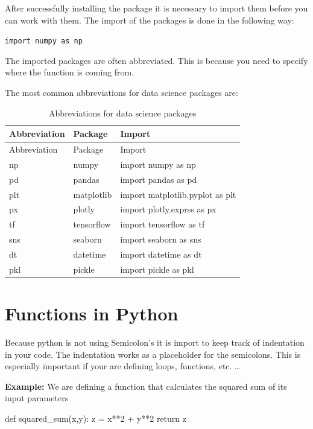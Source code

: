 \documentclass[
  letterpaper,
  DIV=11,
  numbers=noendperiod]{scrreprt}
\newenvironment{Shaded}{\begin{snugshade}}{\end{snugshade}}
\newcommand{\ControlFlowTok}[1]{\textcolor[rgb]{0.00,0.23,0.31}{#1}}
\newcommand{\DecValTok}[1]{\textcolor[rgb]{0.68,0.00,0.00}{#1}}
\newcommand{\KeywordTok}[1]{\textcolor[rgb]{0.00,0.23,0.31}{#1}}
\newcommand{\NormalTok}[1]{\textcolor[rgb]{0.00,0.23,0.31}{#1}}
\newcommand{\OperatorTok}[1]{\textcolor[rgb]{0.37,0.37,0.37}{#1}}
\begin{document}
After successfully installing the package it is necessary to import them
before you can work with them. The import of the packages is done in the
following way:

\texttt{import\ numpy\ as\ np}

The imported packages are often abbreviated. This is because you need to
specify where the function is coming from.

The most common abbreviations for data science packages are:

\begin{longtable}[]{@{}lll@{}}
\caption{Abbreviations for data science packages}\tabularnewline
\toprule\noalign{}
Abbreviation & Package & Import \\
\midrule\noalign{}
\endfirsthead
\toprule\noalign{}
Abbreviation & Package & Import \\
\midrule\noalign{}
\endhead
\bottomrule\noalign{}
\endlastfoot
np & numpy & import numpy as np \\
pd & pandas & import pandas as pd \\
plt & matplotlib & import matplotlib.pyplot as plt \\
px & plotly & import plotly.exprss as px \\
tf & tensorflow & import tensorflow as tf \\
sns & seaborn & import seaborn as sns \\
dt & datetime & import datetime as dt \\
pkl & pickle & import pickle as pkl \\
\end{longtable}

\hypertarget{functions-in-python}{%
\section{Functions in Python}\label{functions-in-python}}

Because python is not using Semicolon's it is import to keep track of
indentation in your code. The indentation works as a placeholder for the
semicolons. This is especially important if your are defining loops,
functions, etc. \ldots{}

\textbf{Example:} We are defining a function that calculates the squared
sum of its input parameters

\begin{Shaded}
\begin{Highlighting}[]
\KeywordTok{def}\NormalTok{ squared\_sum(x,y): }
\NormalTok{    z }\OperatorTok{=}\NormalTok{ x}\OperatorTok{**}\DecValTok{2} \OperatorTok{+}\NormalTok{ y}\OperatorTok{**}\DecValTok{2}
    \ControlFlowTok{return}\NormalTok{ z}
\end{Highlighting}
\end{Shaded}
\end{document}
